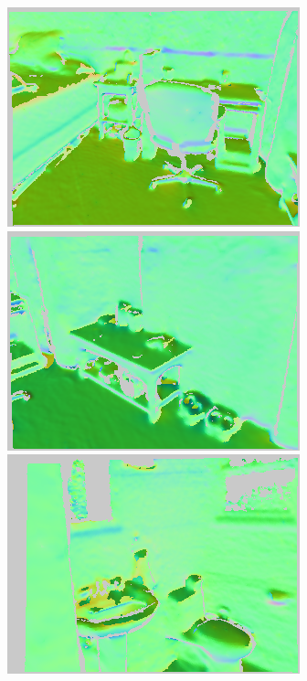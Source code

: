 \begin{figure}
\begin{minipage}{0.19\linewidth}
     \includegraphics[width=\linewidth]{FrameNet/Dataset/pred-000001-Y.png}\\
     \includegraphics[width=\linewidth]{FrameNet/Dataset/pred-000003-Y.png}\\
     \includegraphics[width=\linewidth]{FrameNet/Dataset/pred-000021-Y.png}\\

\end{minipage}
\end{figure}
